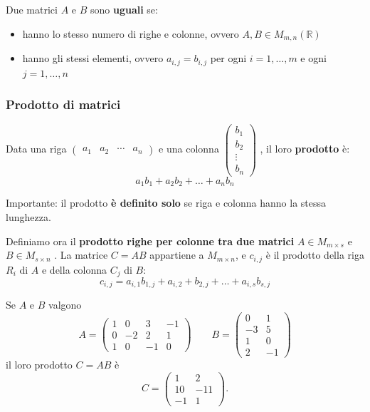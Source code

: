 \documentclass[
  a4paper,
]{article}
\providecommand{\tightlist}{%
  \setlength{\itemsep}{0pt}\setlength{\parskip}{0pt}}
\providecommand{\tightlist}{}
\begin{document}
Due matrici \(A\) e \(B\) sono \textbf{uguali} se:

\begin{itemize}
\tightlist
\item
  hanno lo stesso numero di righe e colonne, ovvero
  \(A, B \in M_{m,n} (\mathbb{R})\)
\item
  hanno gli stessi elementi, ovvero \(a_{i,j} = b_{i, j}\) per ogni
  \(i = 1, \dots, m\) e ogni \(j = 1, \dots, n\)
\end{itemize}

\hypertarget{prodotto-di-matrici}{%
\subsubsection{Prodotto di matrici}\label{prodotto-di-matrici}}

\begin{definitionbox}
Data una riga
\(\left(\begin{array}{cccc} a_{1} & a_{2} & \cdots & a_{n} \end{array}\right)\)
e una colonna
\(\left(\begin{array}{c} b_{1}\\ b_{2}\\ \vdots\\ b_{n} \end{array}\right)\)
, il loro \textbf{prodotto} è: \[
a_1 b_1 + a_2 b_2 + \dots + a_n b_n
\]

Importante: il prodotto \textbf{è definito solo} se riga e colonna hanno
la stessa lunghezza.
\end{definitionbox}

\begin{definitionbox}
Definiamo ora il \textbf{prodotto righe per colonne tra due matrici}
\(A \in M_{m\times s}\) e \(B \in M_{s\times n}\) . La matrice
\(C = AB\) appartiene a \(M_{m\times n}\), e \(c_{i, j}\) è il prodotto
della riga \(R_i\) di \(A\) e della colonna \(C_j\) di \(B\): \[
c_{i, j} = a_{i, 1} b_{1, j} + a_{i, 2} + b_{2, j} + \dots + a_{i, s} b_{s, j}
\]
\end{definitionbox}

\begin{examplebox}
Se \(A\) e \(B\) valgono \[
A=
\begin{pmatrix}
1 & 0 & 3 & -1\\
0 & -2 & 2 & 1\\
1 & 0 & -1 & 0
\end{pmatrix}
\qquad
B=
\begin{pmatrix}
0 & 1\\
-3 & 5\\
1 & 0\\
2 & -1
\end{pmatrix}
\] il loro prodotto \(C = AB\) è \[
C=
\begin{pmatrix}
1 & 2\\
10 & -11\\
-1 & 1
\end{pmatrix}.
\]
\end{examplebox}
\end{document}
